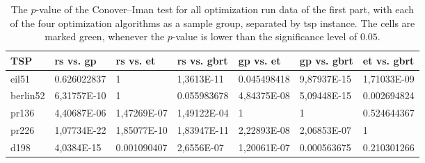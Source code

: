 \begin{table}[h]
	\centering
	\caption[The $p$-value of the Conover–Iman test for all optimization run data of the first part]{The $p$-value of the Conover–Iman test for all optimization run data of the first part, with each of the four optimization algorithms as a sample group, separated by \gls{tsp} instance. The cells are marked green, whenever the $p$-value is lower than the significance level of $0.05$.}
	\label{tab:conover-p}
	
	\begin{adjustbox}{width=1\textwidth}
		\begin{tabular}{ l | l | l | l | l | l | l}
			TSP & \gls{rs} vs. \gls{gp} & \gls{rs} vs. \gls{et} & \gls{rs} vs. \gls{gbrt} & \gls{gp} vs. \gls{et} & \gls{gp} vs. \gls{gbrt} & \gls{et} vs. \gls{gbrt} \\ \hline
			eil51 & \num{0.626022837} & \num{1} & \cellcolor{green!25} \num{1,3613E-11} & \cellcolor{green!25} \num{0,045498418} &  \cellcolor{green!25} \num{9,87937E-15} &\cellcolor{green!25}  \num{1,71033E-09} \\ \hline
			berlin52 & \cellcolor{green!25} \num{6,31757E-10} & \num{1} & \num{0,055983678} & \cellcolor{green!25} \num{4,84375E-08} & \cellcolor{green!25} \num{5,09448E-15} & \cellcolor{green!25} \num{0,002694824} \\ \hline
			pr136 & \cellcolor{green!25} \num{4,40687E-06} &\cellcolor{green!25}  \num{1,47269E-07} & \cellcolor{green!25} \num{1,49122E-04} & \num{1} & \num{1} & \num{0,524644367} \\ \hline
			pr226 & \cellcolor{green!25} \num{1,07734E-22} & \cellcolor{green!25} \num{1,85077E-10} & \cellcolor{green!25} \num{1,83947E-11} & \cellcolor{green!25} \num{2,22893E-08} & \cellcolor{green!25} \num{2,06853E-07} & \num{1} \\ \hline
			d198 & \cellcolor{green!25} \num{4,0384E-15} & \cellcolor{green!25} \num{0,001090407} & \cellcolor{green!25} \num{2,6556E-07} & \cellcolor{green!25} \num{1,20061E-07} & \cellcolor{green!25}  \num{0,000563675} & \num{0,210301266} \\
		\end{tabular}
	\end{adjustbox}
\end{table}

